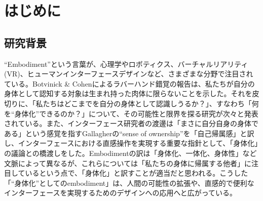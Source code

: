 \chapter{はじめに}
\label{introduction}

\section{研究背景}
\label{subject}
``Embodiment''という言葉が、心理学やロボティクス、バーチャルリアリティ(VR)、ヒューマンインターフェースデザインなど、さまざまな分野で注目されている。Botvinick \& Cohenによるラバーハンド錯覚\cite{BotvinickCohen1998}の報告は、私たちが自分の身体として認知する対象は生まれ持った肉体に限らないことを示した。それを皮切りに、「私たちはどこまでを自分の身体として認識しうるか？」、すなわち「何を``身体化''できるのか？」について、その可能性と限界を探る研究が次々と発表されている。また、インターフェース研究者の渡邊は「まさに自分自身の身体である」という感覚を指すGallagherの``sense of ownership''を「自己帰属感」と訳し、インターフェースにおける直感操作を実現する重要な指針として、「身体化」の議論との橋渡しをした。Embodimentの訳は「身体化、一体化、身体性」など文脈によって異なるが、これらについては「私たちの身体に帰属する他者」に注目しているという点で、「身体化」と訳すことが適当だと思われる。こうした「``身体化''としてのembodiment」は、人間の可能性の拡張や、直感的で便利なインターフェースを実現するためのデザインへの応用へと広がっている。





